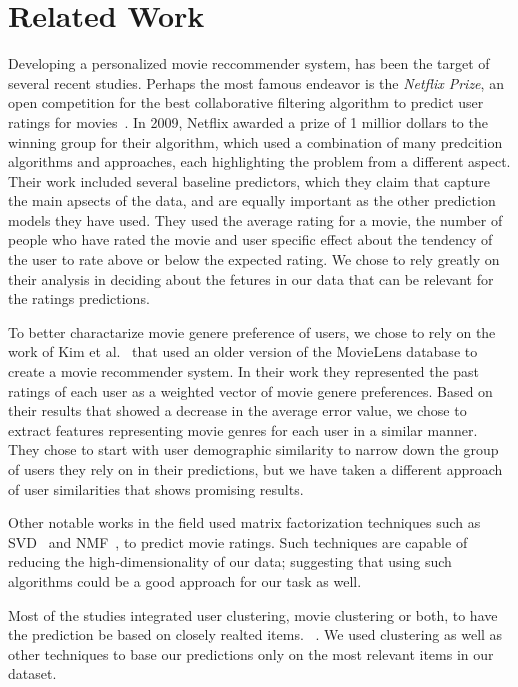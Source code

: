 \section{Related Work}

Developing a personalized movie reccommender system, has been the target of several recent studies. Perhaps the most famous endeavor is the \textit{Netflix Prize}, an open competition for the best collaborative filtering algorithm to predict user ratings for movies~\cite{bell2007bellkor}. In 2009, Netflix awarded a prize of 1 millior dollars to the winning group for their algorithm, which used a combination of many predcition algorithms and approaches, each highlighting the problem from a different aspect. Their work included several baseline predictors, which they claim that capture the main apsects of the data, and are equally important as the other prediction models they have used. They used the average rating for a movie, the number of people who have rated the movie and user specific effect about the tendency of the user to rate above or below the expected rating. We chose to rely greatly on their analysis in deciding about the fetures in our data that can be relevant for the ratings predictions. 

To better charactarize movie genere preference of users, we chose to rely on the work of Kim et al.~\cite{5575081} that used an older version of the MovieLens database to create a movie recommender system. In their work they represented the past ratings of each user as a weighted vector of movie genere preferences. Based on their results that showed a decrease in the average error value, we chose to extract features representing movie genres for each user in a similar manner. They chose to start with user demographic similarity to narrow down the group of users they rely on in their predictions, but we have taken a different approach of user similarities that shows promising results.

Other notable works in the field used matrix factorization techniques such as SVD~\cite{koren2009matrix} and NMF~\cite{nguyen2012modified}, to predict movie ratings. Such techniques are capable of reducing the high-dimensionality of our data; suggesting that using such algorithms could be a good approach for our task as well. 

Most of the studies integrated user clustering, movie clustering or both, to have the prediction be based on closely realted items. ~\cite{bell2007bellkor, 5575081, kim2012recommender}. We used clustering as well as other techniques to base our predictions only on the most relevant items in our dataset.